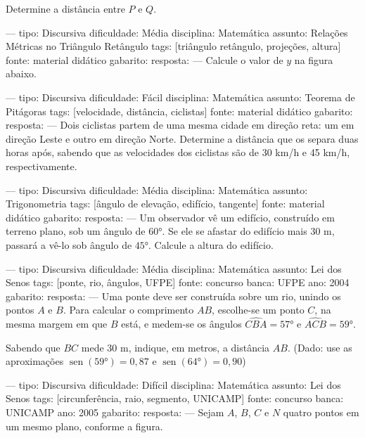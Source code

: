 Determine a distância entre $P$ e $Q$.

---
tipo: Discursiva
dificuldade: Média
disciplina: Matemática
assunto: Relações Métricas no Triângulo Retângulo
tags: [triângulo retângulo, projeções, altura]
fonte: material didático
gabarito:
resposta:
---
\question
Calcule o valor de $y$ na figura abaixo.


---
tipo: Discursiva
dificuldade: Fácil
disciplina: Matemática
assunto: Teorema de Pitágoras
tags: [velocidade, distância, ciclistas]
fonte: material didático
gabarito:
resposta:
---
\question
Dois ciclistas partem de uma mesma cidade em direção reta: um em direção Leste e outro em direção Norte. Determine a distância que os separa duas horas após, sabendo que as velocidades dos ciclistas são de 30 km/h e 45 km/h, respectivamente.

---
tipo: Discursiva
dificuldade: Média
disciplina: Matemática
assunto: Trigonometria
tags: [ângulo de elevação, edifício, tangente]
fonte: material didático
gabarito:
resposta:
---
\question
Um observador vê um edifício, construído em terreno plano, sob um ângulo de $60°$. Se ele se afastar do edifício mais 30 m, passará a vê-lo sob ângulo de $45°$. Calcule a altura do edifício.

---
tipo: Discursiva
dificuldade: Média
disciplina: Matemática
assunto: Lei dos Senos
tags: [ponte, rio, ângulos, UFPE]
fonte: concurso
banca: UFPE
ano: 2004
gabarito:
resposta:
---
\question
Uma ponte deve ser construída sobre um rio, unindo os pontos $A$ e $B$. Para calcular o comprimento $AB$, escolhe-se um ponto $C$, na mesma margem em que $B$ está, e medem-se os ângulos $\widehat{CBA} = 57°$ e $\widehat{ACB} = 59°$.


Sabendo que $BC$ mede 30 m, indique, em metros, a distância $AB$. (Dado: use as aproximações $\operatorname{sen}(59°) = 0{,}87$ e $\operatorname{sen}(64°) = 0{,}90$)

---
tipo: Discursiva
dificuldade: Difícil
disciplina: Matemática
assunto: Lei dos Senos
tags: [circunferência, raio, segmento, UNICAMP]
fonte: concurso
banca: UNICAMP
ano: 2005
gabarito:
resposta:
---
\question
Sejam $A$, $B$, $C$ e $N$ quatro pontos em um mesmo plano, conforme a figura.



